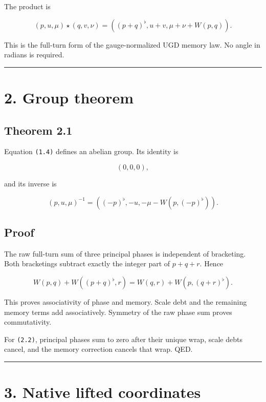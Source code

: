 The product is

\[
\boxed{
(p,u,\mu)\star(q,v,\nu)
=
\left(
(p+q)^\flat,
 u+v,
 \mu+\nu+W(p,q)
\right).
}
\tag{1.4}
\]

This is the full-turn form of the gauge-normalized UGD memory law. No angle in
radians is required.

\begin{center}\rule{0.5\linewidth}{0.5pt}\end{center}

\hypertarget{group-theorem}{%
\section{2. Group theorem}\label{group-theorem}}

\hypertarget{theorem-2.1}{%
\subsection{Theorem 2.1}\label{theorem-2.1}}

Equation \texttt{(1.4)} defines an abelian group. Its identity is

\[
(0,0,0),
\tag{2.1}
\]

and its inverse is

\[
\boxed{
(p,u,\mu)^{-1}
=
\left(
(-p)^\flat,
-u,
-\mu-W(p,(-p)^\flat)
\right).
}
\tag{2.2}
\]

\hypertarget{proof}{%
\subsection{Proof}\label{proof}}

The raw full-turn sum of three principal phases is independent of bracketing.
Both bracketings subtract exactly the integer part of \(p+q+r\). Hence

\[
W(p,q)+W((p+q)^\flat,r)
=
W(q,r)+W(p,(q+r)^\flat).
\tag{2.3}
\]

This proves associativity of phase and memory. Scale debt and the remaining
memory terms add associatively. Symmetry of the raw phase sum proves
commutativity.

For \texttt{(2.2)}, principal phases sum to zero after their unique wrap, scale debts
cancel, and the memory correction cancels that wrap. QED.

\begin{center}\rule{0.5\linewidth}{0.5pt}\end{center}

\hypertarget{native-lifted-coordinates}{%
\section{3. Native lifted coordinates}\label{native-lifted-coordinates}}

